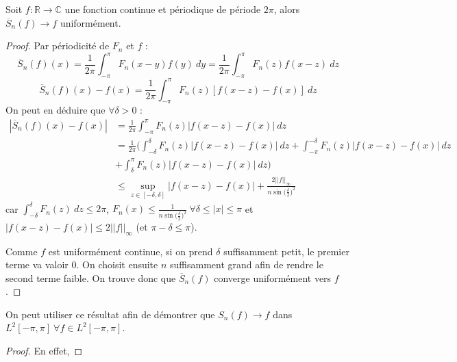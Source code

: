 \begin{theo}[Fejer]
    Soit $f:\mathbb{R}\to\mathbb{C}$ une fonction continue et périodique de période $2\pi$, alors $\overline{S}_n(f)\to f$ uniformément.
\end{theo}
\begin{proof}
    Par périodicité de $F_n$ et $f$ :
    \begin{equation*}
        \overline{S}_n(f)(x) = \frac{1}{2\pi}\int_{-\pi}^\pi F_n(x-y)f(y)\ dy = \frac{1}{2\pi}\int_{-\pi}^\pi F_n(z)f(x-z)\ dz
    \end{equation*}
    \begin{equation*}
        \overline{S}_n(f)(x)-f(x) = \frac{1}{2\pi}\int_{-\pi}^\pi F_n(z)[f(x-z)-f(x)]\ dz
    \end{equation*}
    On peut en déduire que $\forall \delta>0$ :
    \begin{align*}
        |\overline{S}_n(f)(x)-f(x)| & = \frac{1}{2\pi}\int_{-\pi}^\pi F_n(z)|f(x-z)-f(x)|\ dz\\
        & = \frac{1}{2\pi}\Bigg(\int_{-\delta}^\delta F_n(z)|f(x-z)-f(x)|\ dz + \int_{-\pi}^{-\delta} F_n(z)|f(x-z)-f(x)|\ dz \\
        & + \int_{\delta}^\pi F_n(z)|f(x-z)-f(x)|\ dz\Bigg)\\
        & \leq \sup\limits_{z\in[-\delta,\delta]}|f(x-z)-f(x)|+\frac{2||f||_\infty}{n\sin\big(\frac{\delta}{2}\big)^2}
    \end{align*}
    car $\int_{-\delta}^\delta F_n(z)\ dz\leq 2\pi$, $F_n(x)\leq\frac{1}{n\sin\big(\frac{\delta}{2}\big)^2}\ \forall \delta\leq|x|\leq\pi$ et $|f(x-z)-f(x)| \leq 2||f||_\infty$ (et $\pi-\delta\leq\pi$).
    
    Comme $f$ est uniformément continue, si on prend $\delta$ suffisamment petit, le premier terme va valoir $0$. On choisit ensuite $n$ suffisamment grand afin de rendre le second terme faible. On trouve donc que $\overline{S}_n(f)$ converge uniformément vers $f$.
\end{proof}

On peut utiliser ce résultat afin de démontrer que $S_n(f)\to f$ dans $ L^2[-\pi,\pi] \ \forall f\in L^2[-\pi,\pi]$.
\begin{proof}
    En effet,
\end{proof}